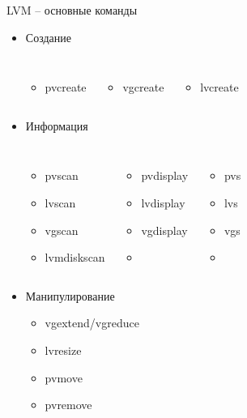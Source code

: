 \documentclass[ignorenonframetext, professionalfonts, hyperref={pdftex, unicode}]{beamer}
\begin{document}
\begin{frame}{LVM -- основные команды}
  \begin{itemize}
    \item Создание
      \begin{columns}
        \begin{itemize}
          \item pvcreate
        \end{itemize}
        \begin{itemize}
          \item vgcreate
        \end{itemize}
        \begin{itemize}
          \item lvcreate
        \end{itemize}
      \end{columns}
     \item Информация 
       \begin{columns}
         \begin{itemize}
           \item pvscan
           \item lvscan
           \item vgscan
		   \item lvmdiskscan
         \end{itemize}
         \begin{itemize}
           \item pvdisplay
           \item lvdisplay
           \item vgdisplay
		   \item[ ]
         \end{itemize}
         \begin{itemize}
           \item pvs
           \item lvs
           \item vgs
		   \item[ ]
         \end{itemize}
	 \end{columns}
      \item Манипулирование
        \begin{itemize}
          \item vgextend/vgreduce
          \item lvresize
          \item pvmove
          \item pvremove
         \end{itemize}
     \end{itemize}
    
\end{frame}
\end{document}
